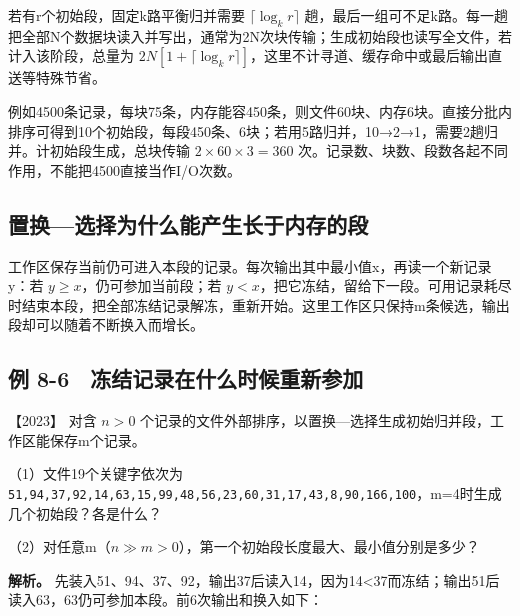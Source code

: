 若有r个初始段，固定k路平衡归并需要 \(\lceil\log_k r\rceil\) 趟，最后一组可不足k路。每一趟把全部N个数据块读入并写出，通常为2N次块传输；生成初始段也读写全文件，若计入该阶段，总量为 \(2N[1+\lceil\log_k r\rceil]\)，这里不计寻道、缓存命中或最后输出直送等特殊节省。

例如4500条记录，每块75条，内存能容450条，则文件60块、内存6块。直接分批内排序可得到10个初始段，每段450条、6块；若用5路归并，10→2→1，需要2趟归并。计初始段生成，总块传输 \(2\times60\times3=360\) 次。记录数、块数、段数各起不同作用，不能把4500直接当作I/O次数。

\subsection{置换---选择为什么能产生长于内存的段}\label{ds-c08-h181}

工作区保存当前仍可进入本段的记录。每次输出其中最小值x，再读一个新记录y：若 \(y\ge x\)，仍可参加当前段；若 \(y<x\)，把它冻结，留给下一段。可用记录耗尽时结束本段，把全部冻结记录解冻，重新开始。这里工作区只保持m条候选，输出段却可以随着不断换入而增长。

\subsection{例 8-6　冻结记录在什么时候重新参加}\label{ds-ex8-6}

\noindent{}【2023】 对含 \(n>0\) 个记录的文件外部排序，以置换---选择生成初始归并段，工作区能保存m个记录。

（1）文件19个关键字依次为 \allowbreak{}\texttt{51,}\allowbreak{}\texttt{94,}\allowbreak{}\texttt{37,}\allowbreak{}\texttt{92,}\allowbreak{}\texttt{14,}\allowbreak{}\texttt{63,}\allowbreak{}\texttt{15,}\allowbreak{}\texttt{99,}\allowbreak{}\texttt{48,}\allowbreak{}\texttt{56,}\allowbreak{}\texttt{23,}\allowbreak{}\texttt{60,}\allowbreak{}\texttt{31,}\allowbreak{}\texttt{17,}\allowbreak{}\texttt{43,}\allowbreak{}\texttt{8,}\allowbreak{}\texttt{90,}\allowbreak{}\texttt{166,}\allowbreak{}\texttt{100}，m=4时生成几个初始段？各是什么？

（2）对任意m（\(n\gg m>0\)），第一个初始段长度最大、最小值分别是多少？


\textbf{解析。} 先装入51、94、37、92，输出37后读入14，因为14\textless37而冻结；输出51后读入63，63仍可参加本段。前6次输出和换入如下：

